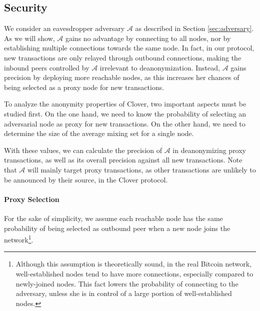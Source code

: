 \documentclass{article}
\begin{document}
	\subsection{Security}
	We consider an eavesdropper adversary $\mathcal{A}$ as described in Section \ref{sec:adversary}.
	As we will show, $\mathcal{A}$ gains no advantage by connecting to all nodes, nor by establishing multiple connections towards the same node.
	In fact, in our protocol, new transactions are only relayed through outbound connections, making the inbound peers controlled by $\mathcal{A}$ irrelevant to deanonymization.
	Instead, $\mathcal{A}$ gains precision by deploying more reachable nodes, as this increases her chances of being selected as a proxy node for new transactions.
	
	To analyze the anonymity properties of Clover, two important aspects must be studied first. 
	On the one hand, we need to know the probability of selecting an adversarial node as proxy for new transactions.
	On the other hand, we need to determine the size of the average mixing set for a single node.
	
	With these values, we can calculate the precision of $\mathcal{A}$ in deanonymizing proxy transactions, as well as its overall precision against all new transactions.
	Note that $\mathcal{A}$ will mainly target proxy transactions, as other transactions are unlikely to be announced by their source, in the Clover protocol.
	
	\paragraph{Proxy Selection}
	For the sake of simplicity, we assume each reachable node has the same probability of being selected as outbound peer when a new node joins the network\footnote{Although this assumption is theoretically sound, in the real Bitcoin network, well-established nodes tend to have more connections, especially compared to newly-joined nodes. This fact lowers the probability of connecting to the adversary, unless she is in control of a large portion of well-established nodes.}.
	
\end{document}
